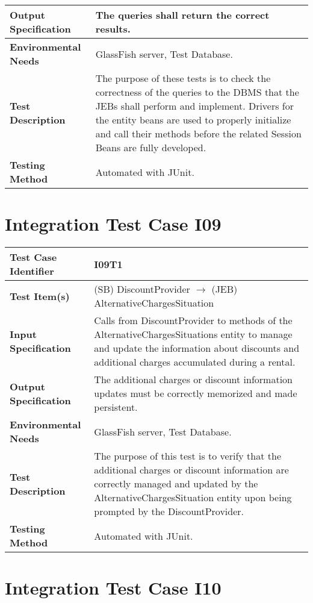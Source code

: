 \begin{longtable}{p{} | p{}}
\hline
\hline
\textbf{Output Specification} & The queries shall return the correct results. \\
\hline
\textbf{Environmental Needs} & GlassFish server, Test Database. \\
\hline
\textbf{Test Description} & The purpose of these tests is to check the correctness of the queries to the DBMS that the JEBs shall perform and implement. Drivers for the entity beans are used to properly initialize and call their methods before the related Session Beans are fully developed. \\
\hline
\textbf{Testing Method} & Automated with JUnit. \\
\hline
\end{longtable}

\section{Integration Test Case I09}

\begin{longtable}{p{} | p{}}
\hline
\textbf{Test Case Identifier} & I09T1\\
\hline
\textbf{Test Item(s)} & (SB) DiscountProvider $\rightarrow$ (JEB) AlternativeChargesSituation \\
\hline
\textbf{Input Specification} & Calls from DiscountProvider to methods of the AlternativeChargesSituations entity to manage and update the information about discounts and additional charges accumulated during a rental.\\
\hline
\textbf{Output Specification} & The additional charges or discount information updates must be correctly memorized and made persistent. \\
\hline
\textbf{Environmental Needs} & GlassFish server, Test Database. \\
\hline
\textbf{Test Description} & The purpose of this test is to verify that the additional charges or discount information are correctly managed and updated by the AlternativeChargesSituation entity upon being prompted by the DiscountProvider. \\
\hline
\textbf{Testing Method} & Automated with JUnit. \\
\hline
\end{longtable}

\section{Integration Test Case I10}

